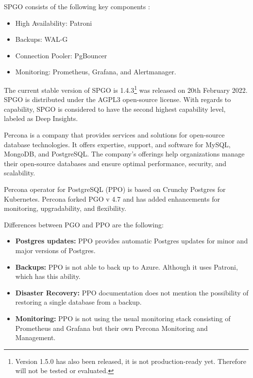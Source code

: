 SPGO consists of the following key components \cite{PostgresOnKubernetes}:
\begin{itemize}
    \item High Availability: Patroni
    \item Backups: WAL-G
    \item Connection Pooler: PgBouncer
    \item Monitoring: Prometheus, Grafana, and Alertmanager.
\end{itemize}


The current stable version of SPGO is 1.4.3\footnote[3]{Version 1.5.0 has also been released, it is not production-ready yet. Therefore will not be tested or evaluated.} was released on 20th February 2022. \cite{SPGOgitlabChangelog} SPGO is distributed under the AGPL3 open-source license. \cite{SPGODocuLicence}
With regards to capability, SPGO is considered to have the second highest capability level, labeled as Deep Insights. \cite{operatorHubStackgres}

\label{chap:ppo}

Percona is a company that provides services and solutions for open-source database technologies. It offers expertise, support, and software for MySQL, MongoDB, and PostgreSQL. The company's offerings help organizations manage their open-source databases and ensure optimal performance, security, and scalability. \cite{Percona}

Percona operator for PostgreSQL (PPO) is based on Crunchy Postgres for Kubernetes. Percona forked PGO v 4.7 and has added enhancements for monitoring, upgradability, and flexibility. \cite{PerconaBlogProsAndCons}

Differences between PGO and PPO are the following:
\begin{itemize}
    \item \textbf{Postgres updates:} PPO provides automatic Postgres updates for minor and major versions of Postgres.  \cite{PerconaDocuUpdate}
    \item \textbf{Backups:} PPO is not able to back up to Azure. \cite{PerconaDocuCompare} Although it uses Patroni, which has this ability.
    \item \textbf{Disaster Recovery:} PPO documentation does not mention the possibility of restoring a single database from a backup. \cite{PerconaDocuBackups}
    \item \textbf{Monitoring:} PPO is not using the usual monitoring stack consisting of Prometheus and Grafana but their own Percona Monitoring and Management. \cite{PerconaDocuMonitoring}
\end{itemize}


